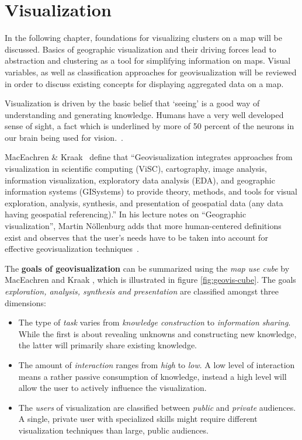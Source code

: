 
%
%

\section{Visualization}
\label{chapter:foundations-vis}

In the following chapter, foundations for visualizing clusters on a map will be discussed. Basics of geographic visualization and their driving forces lead to abstraction and clustering as a tool for simplifying information on maps. Visual variables, as well as classification approaches for geovisualization will be reviewed in order to discuss existing concepts for displaying aggregated data on a map.

Visualization is driven by the basic belief that `seeing' is a good way of understanding and generating knowledge. Humans have a very well developed sense of sight, a fact which is underlined by more of 50 percent of the neurons in our brain being used for vision.~\cite{vislecture}. 

MacEachren \& Kraak~\cite{maceachren-geovis} define that ``Geovisualization integrates approaches from visualization in scientific computing (ViSC), cartography, image analysis, information visualization, exploratory data analysis (EDA), and geographic information systems (GISystems) to provide theory, methods, and tools for visual exploration, analysis, synthesis, and presentation of geospatial data (any data having geospatial referencing).'' In his lecture notes on ``Geographic visualization'', Martin N\"{o}llenburg adds that more human-centered definitions exist and observes that the user's needs have to be taken into account for effective geovisualization techniques~\cite{noellenburg11geovis}.


The \textbf{goals of geovisualization} can be summarized using the \textit{map use cube} by MacEachren and Kraak \cite{MacEachren07cartovis}, which is illustrated in figure \ref{fig:geovis-cube}. The goals \textit{exploration, analysis, synthesis and presentation} are classified amongst three dimensions:

\begin{itemize}

\item The type of \textit{task} varies from \textit{knowledge construction} to \textit{information sharing}. While the first is about revealing unknowns and constructing new knowledge, the latter will primarily share existing knowledge.

\item The amount of \textit{interaction} ranges from \textit{high} to \textit{low}. A low level of interaction means a rather passive consumption of knowledge, instead a high level will allow the user to actively influence the visualization.

\item The \textit{users} of visualization are classified between \textit{public} and \textit{private} audiences. A single, private user with specialized skills might require different visualization techniques than large, public audiences.

\end{itemize}

